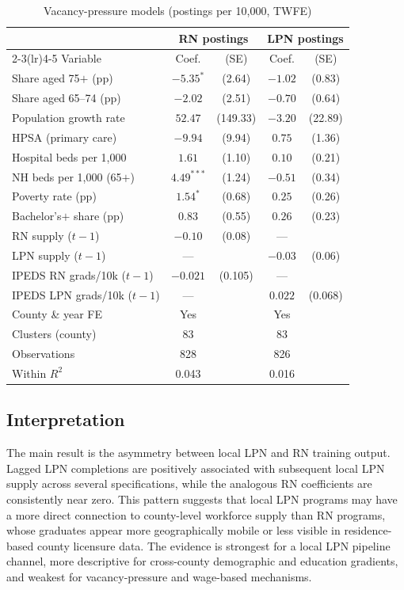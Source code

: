 \documentclass[12pt]{article}
\begin{document}
\begin{table}[!htbp]
\centering
\caption{Vacancy-pressure models (postings per 10{,}000, TWFE)}
\label{tab:vacancy}
\small
\begin{tabular}{lcccc}
\toprule
 & \multicolumn{2}{c}{RN postings} & \multicolumn{2}{c}{LPN postings} \\
\cmidrule(lr){2-3}\cmidrule(lr){4-5}
Variable & Coef. & (SE) & Coef. & (SE) \\
\midrule
Share aged 75$+$ (pp) & $-5.35^{*}$ & (2.64) & $-1.02$ & (0.83) \\
Share aged 65--74 (pp) & $-2.02$ & (2.51) & $-0.70$ & (0.64) \\
Population growth rate & $52.47$ & (149.33) & $-3.20$ & (22.89) \\
HPSA (primary care) & $-9.94$ & (9.94) & $0.75$ & (1.36) \\
Hospital beds per 1{,}000 & $1.61$ & (1.10) & $0.10$ & (0.21) \\
NH beds per 1{,}000 (65$+$) & $4.49^{***}$ & (1.24) & $-0.51$ & (0.34) \\
Poverty rate (pp) & $1.54^{*}$ & (0.68) & $0.25$ & (0.26) \\
Bachelor's$+$ share (pp) & $0.83$ & (0.55) & $0.26$ & (0.23) \\
RN supply ($t-1$) & $-0.10$ & (0.08) & --- &  \\
LPN supply ($t-1$) & --- &  & $-0.03$ & (0.06) \\
IPEDS RN grads/10k ($t-1$) & $-0.021$ & (0.105) & --- &  \\
IPEDS LPN grads/10k ($t-1$) & --- &  & $0.022$ & (0.068) \\
\midrule
County \& year FE & Yes & & Yes & \\
Clusters (county) & 83 & & 83 & \\
Observations & 828 & & 826 & \\
Within $R^{2}$ & 0.043 & & 0.016 & \\
\bottomrule
\end{tabular}
\end{table}

\subsection{Interpretation}\label{sec:headline}

The main result is the asymmetry between local LPN and RN training output.
Lagged LPN completions are positively associated with subsequent local LPN
supply across several specifications, while the analogous RN coefficients
are consistently near zero. This pattern suggests that local LPN programs
may have a more direct connection to county-level workforce supply than RN
programs, whose graduates appear more geographically mobile or less visible
in residence-based county licensure data. The evidence is strongest for a
local LPN pipeline channel, more descriptive for cross-county demographic
and education gradients, and weakest for vacancy-pressure and wage-based
mechanisms.
\end{document}
